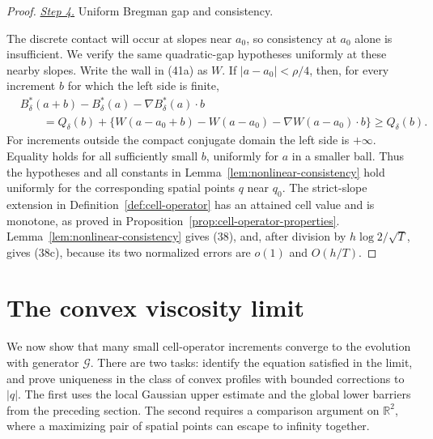 \documentclass{aomart}
\theoremstyle{definition}
\newcommand{\1}{\mathbf 1}
\begin{document}
\begin{proof}
\smallskip\noindent
\underline{\textit{Step 4.}} Uniform Bregman gap and consistency.

The discrete contact will occur at slopes near $a_0$, so consistency
at $a_0$ alone is insufficient.  We verify the same quadratic-gap
hypotheses uniformly at these nearby slopes.  Write the wall in
(41a) as $W$.  If $|a-a_0|<\rho/4$, then, for every increment
$b$ for which the left side is finite,
\begin{equation}
\begin{split}
&B_ \delta^*(a+b)-B_ \delta^*(a)
-\nabla B_ \delta^*(a)\cdot b\\
&\qquad=Q_ \delta(b)+
\{W(a-a_ 0+b)-W(a-a_ 0)-\nabla W(a-a_ 0)\cdot b\}
\geq Q_ \delta(b).                                             
\end{split}
\tag{41e}
\end{equation}
For increments outside the compact conjugate domain the left side is
$+\infty$.  Equality holds for all sufficiently small $b$,
uniformly for $a$ in a smaller ball.  Thus the hypotheses and all
constants in Lemma~\ref{lem:nonlinear-consistency} hold uniformly for the
corresponding spatial points $q$ near $q_ 0$.  The strict-slope
extension in Definition~\ref{def:cell-operator} has an attained cell
value and is monotone, as proved in Proposition~\ref{prop:cell-operator-properties}.  Lemma~\ref{lem:nonlinear-consistency} gives
(38), and, after division by $h\log2/\sqrt T$, gives (38c), because
its two normalized errors are $o(1)$ and $O(h/T)$.

\end{proof}

\section{The convex viscosity limit}\label{sec:viscosity}

We now show that many small cell-operator increments converge to the
evolution with generator $\mathcal G$.  There are two tasks: identify
the equation satisfied in the limit, and prove uniqueness in the class
of convex profiles with bounded corrections to $|q|$.  The first uses
the local Gaussian upper estimate and the global lower barriers from
the preceding section.  The second requires a comparison argument on
$\mathbb R^2$, where a maximizing pair of spatial points can escape
to infinity together.
\end{document}
